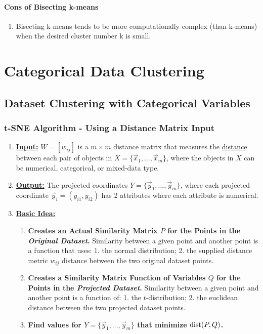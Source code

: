 \documentclass[11pt]{elegantbook}
\begin{document}
\subsubsection*{Cons of Bisecting k-means}
\begin{enumerate}[-]
    \item Bisecting k-means tends to be more computationally complex (than k-means) when the desired cluster number $\mathrm{k}$ is small.
\end{enumerate}


\chapter{Categorical Data Clustering}
\section{Dataset Clustering with Categorical Variables}
\subsection{ t-SNE Algorithm - Using a Distance Matrix Input}
\begin{enumerate}[$\bullet$]
    \item \textbf{\underline{Input:}} $W=[w_{ij}]$ is a $m\times m$ distance matrix that measures the \underline{distance} between each pair of objects in $X=\{\vec{x}_1,...,\vec{x}_m\}$, where the objects in $X$ can be numerical, categorical, or mixed-data type.
    \item \textbf{\underline{Output:}} The projected coordinates $Y=\{\vec{y}_1,...,\vec{y}_m\}$, where each projected coordinate $\vec{y}_i=(y_{i1},y_{i2})$ has 2 attributes where each attribute is numerical.
    \item \textbf{\underline{Basic Idea:}}
    \begin{enumerate}[(1).]
        \item \textbf{Creates an Actual Similarity Matrix $P$ for the Points in the \textit{Original Dataset}.} Similarity between a given point and another point is a function that uses: 1. the normal distribution; 2. the supplied distance metric $w_{ij}$ distance between the two original dataset points.
        \item \textbf{Creates a Similarity Matrix Function of Variables $Q$ for the Points in the \textit{Projected Dataset}.} Similarity between a given point and another point is a function of: 1. the $t$-distribution; 2. the euclidean distance between the two projected dataset points.
        \item \textbf{Find values for $Y=\{\vec{y}_1,...,\vec{y}_m\}$ that minimize $\textnormal{dist}(P,Q)$.}
    \end{enumerate}
\end{enumerate}
\end{document}

